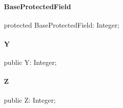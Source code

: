 \documentclass{report}
\begin{document}
\paragraph*{BaseProtectedField}\hspace*{\fill}

\begin{list}{}{
\setlength{\itemindent}{0cm}
\setlength{\listparindent}{0cm}
\setlength{\leftmargin}{\evensidemargin}
\addtolength{\leftmargin}{\tmplength}
\settowidth{\labelsep}{X}
\addtolength{\leftmargin}{\labelsep}
\setlength{\labelwidth}{\tmplength}
}
\begin{flushleft}
\item[\textbf{Declaration}\hfill]
\begin{ttfamily}
protected BaseProtectedField: Integer;\end{ttfamily}


\end{flushleft}
\end{list}
\paragraph*{Y}\hspace*{\fill}

\begin{list}{}{
\setlength{\itemindent}{0cm}
\setlength{\listparindent}{0cm}
\setlength{\leftmargin}{\evensidemargin}
\addtolength{\leftmargin}{\tmplength}
\settowidth{\labelsep}{X}
\addtolength{\leftmargin}{\labelsep}
\setlength{\labelwidth}{\tmplength}
}
\begin{flushleft}
\item[\textbf{Declaration}\hfill]
\begin{ttfamily}
public Y: Integer;\end{ttfamily}


\end{flushleft}
\end{list}
\paragraph*{Z}\hspace*{\fill}

\begin{list}{}{
\setlength{\itemindent}{0cm}
\setlength{\listparindent}{0cm}
\setlength{\leftmargin}{\evensidemargin}
\addtolength{\leftmargin}{\tmplength}
\settowidth{\labelsep}{X}
\addtolength{\leftmargin}{\labelsep}
\setlength{\labelwidth}{\tmplength}
}
\begin{flushleft}
\item[\textbf{Declaration}\hfill]
\begin{ttfamily}
public Z: Integer;\end{ttfamily}


\end{flushleft}
\end{list}
\end{document}
